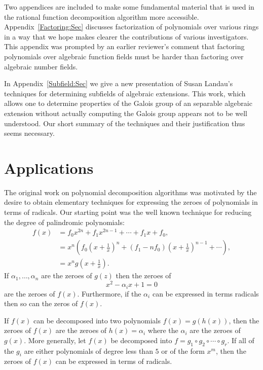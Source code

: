 Two appendices are included to make some fundamental material that is
used in the rational function decomposition algorithm more accessible.
Appendix~\ref{Factoring:Sec} discusses factorization of polynomials
over various rings in a way that we hope makes clearer the
contributions of various investigators.  This appendix was prompted by
an earlier reviewer's comment that factoring polynomials over
algebraic function fields must be harder than factoring over algebraic
number fields.

In Appendix~\ref{Subfield:Sec} we give a new presentation of Susan
Landau's techniques for determining subfields of algebraic extensions.
This work, which allows one to determine properties of the Galois
group of an separable algebraic extension without actually computing
the Galois group appears not to be well understood.  Our short summary
of the techniques and their justification thus seems necessary.



\section{Applications}
\label{Applications:Sec}

The original work on polynomial decomposition algorithms
\cite{Barton1985-hz} was motivated by the desire to obtain elementary 
techniques for expressing the zeroes of polynomials in terms of
radicals.  Our starting point was the well known technique for
reducing the degree of palindromic polynomials:
\[
\begin{aligned}
f(x) & = f_0x^{2n} + f_1 x^{2n-1} + \cdots + f_1 x + f_0, \\
     & =  x^n \left( f_0 \left(x + \frac{1}{x}\right)^n 
    + (f_1 - n f_0) \left(x + \frac{1}{x}\right)^{n-1} + \cdots \right), \\
     & = x^n g\left(x + \frac{1}{x}\right). 
\end{aligned}
\]
If $\alpha_1, \ldots, \alpha_n$ are the zeroes of $g(z)$ then the zeroes
of 
\[
x^2 - \alpha_i x + 1 = 0
\]
are the zeroes of $f(x)$.  Furthermore, if the $\alpha_i$ can be expressed
in terms radicals then so can the zeros of $f(x)$.

If $f(x)$ can be decomposed into two polynomials $f(x) =g(h(x))$, then the
zeroes of $f(x)$ are the zeroes of $h(x) = \alpha_i$ where the $\alpha_i$
are the zeroes of $g(x)$.  More generally, let $f(x)$ be decomposed into $f
= g_1 \circ g_2 \circ \cdots \circ g_r$.  If all of the $g_i$ are either
polynomials of degree less than $5$ or of the form $x^m$, then the zeroes
of $f(x)$ can be expressed in terms of radicals.

